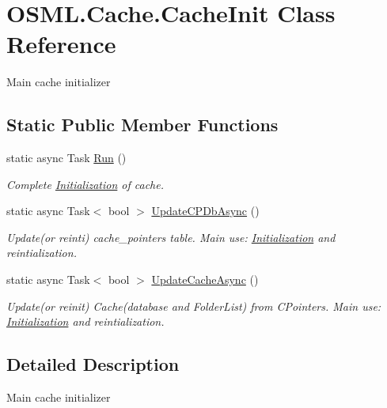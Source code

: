 \hypertarget{classOSML_1_1Cache_1_1CacheInit}{}\section{O\+S\+M\+L.\+Cache.\+Cache\+Init Class Reference}
\label{classOSML_1_1Cache_1_1CacheInit}


Main cache initializer  


\subsection*{Static Public Member Functions}
\begin{DoxyCompactItemize}
\item 
static async Task \mbox{\hyperlink{classOSML_1_1Cache_1_1CacheInit_a69c54afb3ce3a5c203b5721209d6e171}{Run}} ()
\begin{DoxyCompactList}\small\item\em Complete \mbox{\hyperlink{classOSML_1_1Initialization}{Initialization}} of cache. \end{DoxyCompactList}\item 
static async Task$<$ bool $>$ \mbox{\hyperlink{classOSML_1_1Cache_1_1CacheInit_a98bab831f4b3c30b6c932941d4188b28}{Update\+C\+P\+Db\+Async}} ()
\begin{DoxyCompactList}\small\item\em Update(or reinti) cache\+\_\+pointers table. Main use\+: \mbox{\hyperlink{classOSML_1_1Initialization}{Initialization}} and reintialization. \end{DoxyCompactList}\item 
static async Task$<$ bool $>$ \mbox{\hyperlink{classOSML_1_1Cache_1_1CacheInit_a56b31b12176e0eedb18e704e9f1539d5}{Update\+Cache\+Async}} ()
\begin{DoxyCompactList}\small\item\em Update(or reinit) Cache(database and Folder\+List) from C\+Pointers. Main use\+: \mbox{\hyperlink{classOSML_1_1Initialization}{Initialization}} and reintialization. \end{DoxyCompactList}\end{DoxyCompactItemize}


\subsection{Detailed Description}
Main cache initializer 




